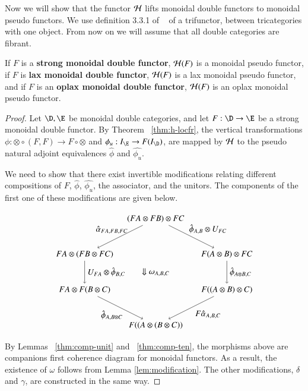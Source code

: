 \documentclass{amsart}
\begin{document}
Now we will show that the functor $\mathcal{H}$ lifts monoidal double functors to monoidal pseudo functors. We use definition 3.3.1 of ~\cite{nick:tricats} of a trifunctor, between tricategories with one object. From now on we will assume that all double categories are fibrant.

\begin{lem}\label{lem:monfun}
If $F$ is a {\bf strong monoidal double functor}, $\mathcal{H}(F)$ is a monoidal pseudo functor, if $F$ is {\bf lax monoidal double functor}, $\mathcal{H}(F)$ is a lax monoidal pseudo functor, and if $F$ is an {\bf oplax monoidal double functor}, $\mathcal{H}(F)$ is an oplax monoidal pseudo functor. 
\end{lem}

\begin{proof}
Let $\D, \E$ be monoidal double categories, and let $F:\D \rightarrow \E$ be a strong monoidal double functor. 
By Theorem ~\ref{thm:h-locfr}, the vertical transformations $\phi: \otimes \circ (F,F) \rightarrow F \circ \otimes $ and $\phi_u: I_{\E} \rightarrow F(I_{\D})$, are mapped by $\mathcal{H}$ to the pseudo natural adjoint equivalences $\hat{\phi}$ and $\hat{\phi_u}$.

We need to show that there exist invertible modifications relating  different compositions of $F$, $\hat{\phi}$, $\hat{\phi_u}$, the associator, and the unitors. 
The components of the first one of these modifications are given below.

\begin{equation}
\begin{tikzpicture}[scale=1.5]
\node (t) at (2,3) {$(FA \otimes FB) \otimes FC$};
\node (tl) at (0,2) {$FA \otimes (FB \otimes FC)$};
\node (bl) at (0,1) {$FA \otimes  F(B \otimes C)$};
\node (b) at (2,0) {$F((A \otimes (B \otimes C))$};
\node (tr) at (4,2) {$F(A \otimes B) \otimes FC$};
\node (br) at (4,1) {$F((A \otimes B) \otimes C)$};
\draw[->] (t) to node [above,xshift=20pt] {$\hat{\phi}_{A,B} \otimes U_{FC}$} (tr);
\draw[->] (tr) to node [right] {$\hat{\phi}_{A \otimes B,C} $} (br);
\draw[->] (br) to node [below,xshift=20pt] {$F\hat{\alpha}_{A,B,C}$} (b);
\draw[->] (t) to node [above,xshift=-10pt] {$\hat{\alpha}_{FA, FB, FC}$} (tl);
\draw[->] (tl) to node [right] {$U_{FA} \otimes \hat{\phi}_{B,C} $} (bl);
\draw[->] (bl) to node [below,xshift=-10pt] {$\hat{\phi}_{A, B \otimes C}$} (b);
\node at (2,1.5) {$\Downarrow \omega_{A,B,C}$};
\end{tikzpicture}
\end{equation} 

By Lemmas ~\ref{thm:comp-unit}
and ~\ref{thm:comp-ten}, the morphisms above are companions first coherence diagram for monoidal functors. As a result, the existence of $\omega$ follows from Lemma \ref{lem:modification}. The other modifications, $\delta$ and $\gamma$, are constructed in the same way.


\end{proof}
\end{document}
